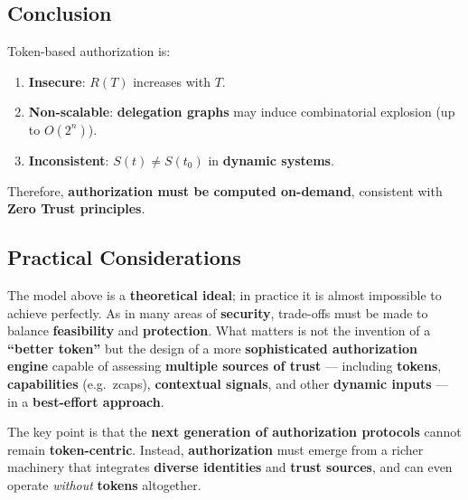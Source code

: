 \subsection{Conclusion}
Token-based authorization is:
\begin{enumerate}
\item \textbf{Insecure}: $R(T)$ increases with $T$.
\item \textbf{Non-scalable}: \textbf{delegation graphs} may induce combinatorial explosion (up to $O(2^n)$).
\item \textbf{Inconsistent}: $S(t) \neq S(t_0)$ in \textbf{dynamic systems}.
\end{enumerate}
Therefore, \textbf{authorization must be computed on-demand}, consistent with \textbf{Zero Trust principles}.

\subsection{Practical Considerations}
The model above is a \textbf{theoretical ideal}; in practice it is almost impossible to achieve perfectly. 
As in many areas of \textbf{security}, trade-offs must be made to balance \textbf{feasibility} and \textbf{protection}.  
What matters is not the invention of a \textbf{``better token''} but the design of a more \textbf{sophisticated authorization engine} capable of assessing \textbf{multiple sources of trust} --- including \textbf{tokens}, 
\textbf{capabilities} (e.g.\ zcaps), \textbf{contextual signals}, and other \textbf{dynamic inputs} --- in a \textbf{best-effort approach}.  

The key point is that the \textbf{next generation of authorization protocols} cannot remain \textbf{token-centric}. 
Instead, \textbf{authorization} must emerge from a richer machinery that integrates \textbf{diverse identities} 
and \textbf{trust sources}, and can even operate \emph{without} \textbf{tokens} altogether.
